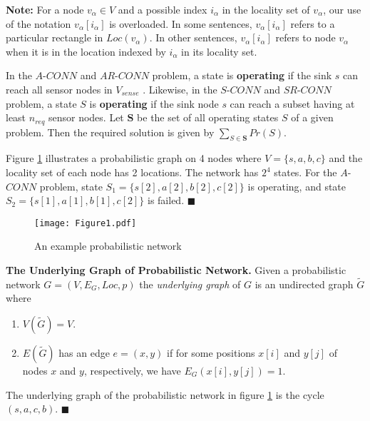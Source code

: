 {\bf Note:} For a node $v_{\alpha}\in V$ and a possible index $i_\alpha$ in the locality set of $v_{\alpha}$, our use of the notation $v_{\alpha}[i_{\alpha}]$ is overloaded. In some sentences, $v_{\alpha}[i_{\alpha}]$ refers to a particular rectangle in $Loc(v_{\alpha})$. In other sentences, $v_{\alpha}[i_{\alpha}]$ refers to node $v_{\alpha}$ when it is in the location indexed by $i_{\alpha}$ in its locality set. 


In the $A$-$CONN$ and $AR$-$CONN$ problem, a state is \textbf{operating} if the
sink $s$ can reach all sensor nodes in $V_{sense}$ . Likewise, in
the $S$-$CONN$ and $SR$-$CONN$ problem, a state $S$ is \textbf{operating} if the sink node $s$ can reach a subset having at least $n_{req}$ sensor
nodes. Let $\textbf{S}$ be the set of all operating states $S$ of a
given problem. Then the required solution is given by
$\sum_{S\in \textbf{S}} Pr(S)$.

\begin{example}
\normalfont
Figure \ref{fig:Exmp1} illustrates a probabilistic graph on 4 nodes where $V=\{s,a,b,c\}$ and the locality set of each node has 2 locations. The network has $2^4$ states. For the $A$-$CONN$ problem, state $S_1= \{ s[2], a[2], b[2], c[2] \}$ is operating, and
     state $S_2= \{ s[1], a[1], b[1], c[2] \}$ is failed. $\blacksquare$
\end{example}
\begin{figure}[h]
\centering
\texttt{[image: Figure1.pdf]}
 \caption{ An example probabilistic network}
 \label{fig:Exmp1}
\end{figure}

\textbf{The Underlying Graph of Probabilistic Network.} Given a probabilistic network $G=(V,E_G,Loc,p)$ the \textit{underlying graph} of $G$ is an undirected graph $\tilde{G}$ where

\begin{enumerate}[noitemsep]
\item $V(\tilde{G})=V$.
\item $E(\tilde{G})$ has an edge $e=(x,y)$ if for some positions $x[i]$ and $y[j]$ of nodes $x$ and $y$, respectively, we have $E_G(x[i],y[j])=1$.
\end{enumerate}


\begin{example}
\normalfont
The underlying graph of the probabilistic network in figure \ref{fig:Exmp1} is the cycle $(s,a,c,b)$. $\blacksquare$
\end{example}


